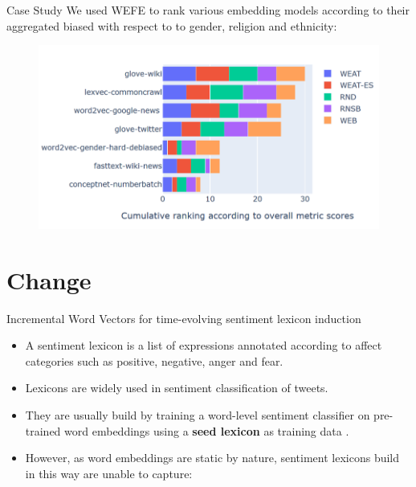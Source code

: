 \documentclass[handout]{beamer}
\begin{document}
\begin{frame}{Case Study}
\scriptsize{
We used WEFE to rank various embedding models according to their aggregated biased with respect to to gender, religion and ethnicity:}


  \begin{figure}[h]
        	\includegraphics[scale = 0.3]{pics/weferanking.png}
        \end{figure}

\end{frame}


\section{Change}

\begin{frame}{Incremental Word Vectors for time-evolving sentiment lexicon induction}
\begin{scriptsize}
\begin{itemize}
 \item  A sentiment lexicon is a list of expressions annotated according to affect categories such as positive, negative, anger and fear.

 \item  Lexicons are widely used in sentiment classification of tweets.

 \item They are usually build by training a word-level sentiment classifier on pre-trained word embeddings using a \textbf{seed lexicon} as training data \cite{TangCol14}.

 \item  However, as word embeddings are static by nature, sentiment lexicons build in this way are  unable to capture:




\end{itemize}


\end{scriptsize}
\end{frame}
\end{document}
